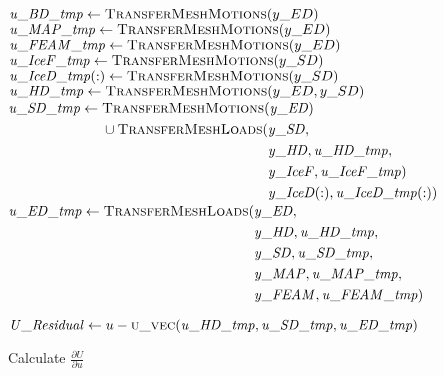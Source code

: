 \documentclass[10pt,letterpaper,oneside,notitlepage]{article}
\begin{document}
\begin{algorithmic}[1]
      \State$\mathit{u\_BD\_tmp}      \gets \Call{TransferMeshMotions}{y\_ED}$
      \State$\mathit{u\_MAP\_tmp}     \gets \Call{TransferMeshMotions}{y\_ED}$
      \State$\mathit{u\_FEAM\_tmp}    \gets \Call{TransferMeshMotions}{y\_ED}$
      \State$\mathit{u\_IceF\_tmp}    \gets \Call{TransferMeshMotions}{y\_SD}$
      \State$\mathit{u\_IceD\_tmp(:)} \gets \Call{TransferMeshMotions}{y\_SD}$
      \State$\mathit{u\_HD\_tmp}      \gets \Call{TransferMeshMotions}{y\_ED,y\_SD}$
      \State$\mathit{u\_SD\_tmp}      \gets \!
            \begin{aligned}[t]
           & \Call{TransferMeshMotions}{\mathit{y\_ED}}  \\
                & \cup \Call{TransferMeshLoads}{}(\!
                   \begin{aligned}[t] 
                        & \mathit{y\_SD}, \\
                        & \mathit{y\_HD},\mathit{u\_HD\_tmp}, \\
                        & \mathit{y\_IceF},\mathit{u\_IceF\_tmp}) \\
                        & \mathit{y\_IceD(:)},\mathit{u\_IceD\_tmp(:)}) \\
                     \end{aligned}
         \end{aligned}$
      \State$\mathit{u\_ED\_tmp} \gets \Call{TransferMeshLoads}{}( \!
                 \begin{aligned}[t]   & \mathit{y\_ED}, \\
                                      & \mathit{y\_HD},  \mathit{u\_HD\_tmp},  \\
                                      & \mathit{y\_SD},  \mathit{u\_SD\_tmp},  \\  
                                      & \mathit{y\_MAP}, \mathit{u\_MAP\_tmp}, \\ 
                                      & \mathit{y\_FEAM},\mathit{u\_FEAM\_tmp} )
                     \end{aligned}$

      \State
      \State$\mathit{U\_Residual} \gets u - \Call{u\_vec}{\mathit{u\_HD\_tmp},\mathit{u\_SD\_tmp},\mathit{u\_ED\_tmp}}$
      \State
      
         \State Calculate $\frac{\partial U}{\partial u}$
      \EndIf
      


\end{algorithmic}
\end{document}
